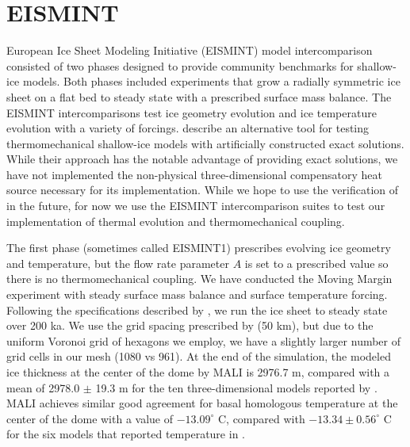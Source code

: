 
    
\section{EISMINT}
European Ice Sheet Modeling Initiative (EISMINT) model intercomparison
consisted of two phases designed to provide community benchmarks for shallow-ice models.
Both phases included experiments that grow a radially symmetric ice sheet on a flat bed to 
steady state with a prescribed surface mass balance.
The EISMINT intercomparisons test ice geometry evolution and ice temperature evolution with a variety of forcings.
\citet{bueler2007} describe an alternative tool for testing thermomechanical shallow-ice models
with artificially constructed exact solutions.
While their approach has the notable advantage of providing exact solutions,
we have not implemented the non-physical three-dimensional compensatory heat source
necessary for its implementation.
While we hope to use the verification of \citet{bueler2007} in the future,
for now we use the EISMINT intercomparison suites to test our implementation 
of thermal evolution and thermomechanical coupling.

The first phase \citep{huybrechts1996} (sometimes called EISMINT1) prescribes evolving ice geometry
and temperature, but the flow rate parameter $A$ is set to a prescribed value
so there is no thermomechanical coupling.
We have conducted the Moving Margin experiment with steady surface mass balance
and surface temperature forcing.
Following the specifications described by \citet{huybrechts1996},
we run the ice sheet to steady state over 200 ka.
We use the grid spacing prescribed by \citet{huybrechts1996} (50 km),
but due to the uniform Voronoi grid of hexagons we employ,
we have a slightly larger number of grid cells in our mesh (1080 vs 961).
At the end of the simulation, the modeled ice thickness at the center of the dome by MALI
is 2976.7 m, compared with a mean of 2978.0 $\pm$ 19.3 m for the ten three-dimensional models
reported by \citet{huybrechts1996}.
MALI achieves similar good agreement for basal homologous temperature at the center of the dome
with a value of $-13.09 ^{\circ}$ C, compared with $-13.34 \pm 0.56 ^{\circ}$ C for the six
models that reported temperature in \citet{huybrechts1996}.

